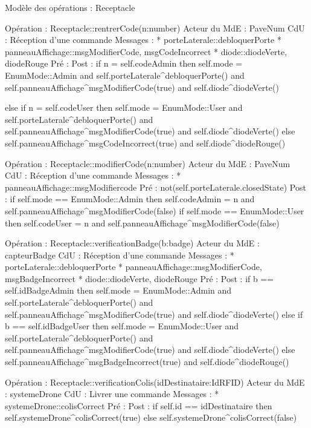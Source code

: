 Modèle des opérations : Receptacle


Opération : Receptacle::rentrerCode(n:number)
Acteur du MdE : PaveNum
CdU : Réception d’une commande
Messages : 
* porteLaterale::{debloquerPorte}
* panneauAffichage::{msgModifierCode, msgCodeIncorrect}
* diode::{diodeVerte, diodeRouge}
Pré :
Post :
if n = self.codeAdmin then
self.mode = EnumMode::Admin
and
self.porteLaterale^debloquerPorte()
and
self.panneauAffichage^msgModifierCode(true)
and
self.diode^diodeVerte() 


else if n = self.codeUser then 
self.mode = EnumMode::User
and
self.porteLaterale^debloquerPorte()
and
self.panneauAffichage^msgModifierCode(true)
and
self.diode^diodeVerte()
else
self.panneauAffichage^msgCodeIncorrect(true)
and
self.diode^diodeRouge()
        


Opération : Receptacle::modifierCode(n:number)
Acteur du MdE : PaveNum
CdU : Réception d’une commande
Messages : 
* panneauAffichage::{msgModifiercode}
Pré :        
not(self.porteLaterale.closedState)
Post :
        if self.mode == EnumMode::Admin then
                self.codeAdmin = n
and
self.panneauAffichage^msgModifierCode(false)
        if self.mode == EnumMode::User then
                self.codeUser = n
and
self.panneauAffichage^msgModifierCode(false)


                
                


Opération : Receptacle::verificationBadge(b:badge)
Acteur du MdE : capteurBadge
CdU : Réception d’une commande
Messages : 
* porteLaterale::{debloquerPorte}
* panneauAffichage::{msgModifierCode, msgBadgeIncorrect}
* diode::{diodeVerte, diodeRouge}
Pré :
Post : 
if b == self.idBadgeAdmin then
self.mode = EnumMode::Admin
and
self.porteLaterale^debloquerPorte()
and
self.panneauAffichage^msgModifierCode(true)
and
self.diode^diodeVerte() 
else if b == self.idBadgeUser then 
self.mode = EnumMode::User
and
self.porteLaterale^debloquerPorte()
and
self.panneauAffichage^msgModifierCode(true)
and
self.diode^diodeVerte()
else
self.panneauAffichage^msgBadgeIncorrect(true)
and
self.diode^diodeRouge()
        


Opération : Receptacle::verificationColis(idDestinataire:IdRFID)
Acteur du MdE : systemeDrone
CdU : Livrer une commande
Messages : 
* systemeDrone::{colisCorrect}
Pré :
Post :
        if self.id == idDestinataire then
                self.systemeDrone^colisCorrect(true)
        else
                self.systemeDrone^colisCorrect(false)


